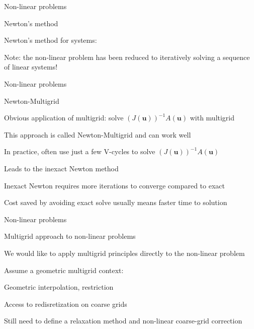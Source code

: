 \documentclass[18pt,xcolor=table]{beamer}
\begin{document}
\begin{frame}{Non-linear problems}
\begin{block}{Newton's method}
\bit
\item Newton's method for systems:
\item Note: the non-linear problem has been reduced to iteratively solving a sequence of linear systems!
\eit
\end{block}
\end{frame}

\begin{frame}{Non-linear problems}
\begin{block}{Newton-Multigrid}
\bit
\item Obvious application of multigrid: solve $(J(\mathbf{u}))^{-1}A(\mathbf{u})$ with multigrid
\item This approach is called Newton-Multigrid and can work well
\item In practice, often use just a few V-cycles to solve $(J(\mathbf{u}))^{-1}A(\mathbf{u})$
\item Leads to the inexact Newton method
\bit
\item Inexact Newton requires more iterations to converge compared to exact
\item Cost saved by avoiding exact solve usually means faster time to solution
\eit
\eit
\end{block}
\end{frame}

\begin{frame}{Non-linear problems}
\begin{block}{Multigrid approach to non-linear problems}
\bit
\item We would like to apply multigrid principles directly to the non-linear problem
\item Assume a geometric multigrid context: 
\bit 
\item Geometric interpolation, restriction
\item Access to redisretization on coarse grids
\eit
\item Still need to define a relaxation method and non-linear coarse-grid correction
\eit
\end{block}
\end{frame}
\end{document}
